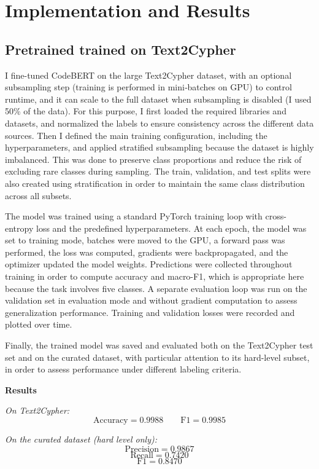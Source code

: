 \documentclass{article}
\begin{document}
\section{Implementation and Results}



\subsection{Pretrained trained on Text2Cypher }

I fine-tuned CodeBERT on the large Text2Cypher dataset, with an optional subsampling  step (training is performed in mini‑batches on GPU) to control runtime, and it can scale to the full dataset when subsampling is disabled (I used 50\% of the data). For this purpose, I first loaded the required libraries and datasets, and normalized the labels to ensure consistency across the different data sources. Then I defined the main training configuration, including the hyperparameters, and applied stratified subsampling because the dataset is highly imbalanced. This was done to preserve class proportions and reduce the risk of excluding rare classes during sampling. The train, validation, and test splits were also created using stratification in order to maintain the same class distribution across all subsets.

The model was trained using a standard PyTorch training loop with cross-entropy loss and the predefined hyperparameters. At each epoch, the model was set to training mode, batches were moved to the GPU, a forward pass was performed, the loss was computed, gradients were backpropagated, and the optimizer updated the model weights. Predictions were collected throughout training in order to compute accuracy and macro-F1, which is appropriate here because the task involves five classes. A separate evaluation loop was run on the validation set in evaluation mode and without gradient computation to assess generalization performance. Training and validation losses were recorded and plotted over time.

Finally, the trained model was saved and evaluated both on the Text2Cypher test set and on the curated dataset, with particular attention to its hard-level subset, in order to assess performance under different labeling criteria.
 

\textbf{Results}

\textit{On Text2Cypher:}
\[
\text{Accuracy} = 0.9988 \qquad \text{F1} = 0.9985
\]

\textit{On the curated dataset (hard level only):}
\[
\text{Precision} = 0.9867
\]
\[
\text{Recall} = 0.7420
\]
\[
\text{F1} = 0.8470
\]
\end{document}
